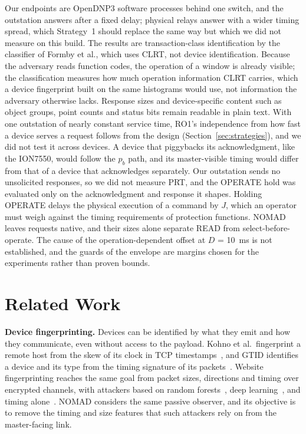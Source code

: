 \documentclass[conference]{IEEEtran}
\begin{document}
Our endpoints are OpenDNP3 software processes behind one switch, and the outstation answers after a fixed delay; physical relays answer with a wider timing spread, which Strategy~1 should replace the same way but which we did not measure on this build. The results are transaction-class identification by the classifier of Formby et al., which uses CLRT, not device identification. Because the adversary reads function codes, the operation of a window is already visible; the classification measures how much operation information CLRT carries, which a device fingerprint built on the same histograms would use, not information the adversary otherwise lacks. Response sizes and device-specific content such as object groups, point counts and status bits remain readable in plain text. With one outstation of nearly constant service time, RO1's independence from how fast a device serves a request follows from the design (Section~\ref{sec:strategies}), and we did not test it across devices. A device that piggybacks its acknowledgment, like the ION7550, would follow the $p_b$ path, and its master-visible timing would differ from that of a device that acknowledges separately. Our outstation sends no unsolicited responses, so we did not measure PRT, and the OPERATE hold was evaluated only on the acknowledgment and response it shapes. Holding OPERATE delays the physical execution of a command by $J$, which an operator must weigh against the timing requirements of protection functions. NOMAD leaves requests native, and their sizes alone separate READ from select-before-operate. The cause of the operation-dependent offset at $D$ = 10~ms is not established, and the guards of the envelope are margins chosen for the experiments rather than proven bounds.
\section{Related Work}
\label{sec:related}

\textbf{Device fingerprinting.} Devices can be identified by what they emit and how they communicate, even without access to the payload. Kohno et al.\ fingerprint a remote host from the skew of its clock in TCP timestamps~\cite{kohno2005}, and GTID identifies a device and its type from the timing signature of its packets~\cite{gtid2015}. Website fingerprinting reaches the same goal from packet sizes, directions and timing over encrypted channels, with attackers based on random forests~\cite{kfp2016}, deep learning~\cite{sirinam2018}, and timing alone~\cite{tiktok2020}. NOMAD considers the same passive observer, and its objective is to remove the timing and size features that such attackers rely on from the master-facing link.
\end{document}
